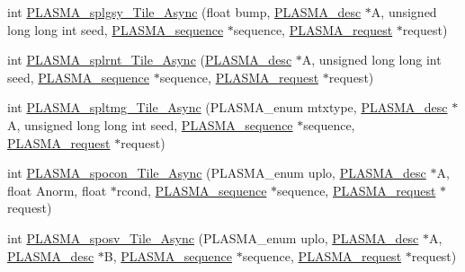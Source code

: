 \begin{DoxyCompactItemize}
\item 
int \hyperlink{group__float__Tile__Async_gaeee90dc0db10bd50a634bfd24658a5c6_gaeee90dc0db10bd50a634bfd24658a5c6}{P\+L\+A\+S\+M\+A\+\_\+splgsy\+\_\+\+Tile\+\_\+\+Async} (float bump, \hyperlink{structplasma__desc__t}{P\+L\+A\+S\+M\+A\+\_\+desc} $\ast$A, unsigned long long int seed, \hyperlink{structplasma__sequence__t}{P\+L\+A\+S\+M\+A\+\_\+sequence} $\ast$sequence, \hyperlink{structplasma__request__t}{P\+L\+A\+S\+M\+A\+\_\+request} $\ast$request)
\item 
int \hyperlink{group__float__Tile__Async_ga890ff04d43c21904fb6213d9b3b152fb_ga890ff04d43c21904fb6213d9b3b152fb}{P\+L\+A\+S\+M\+A\+\_\+splrnt\+\_\+\+Tile\+\_\+\+Async} (\hyperlink{structplasma__desc__t}{P\+L\+A\+S\+M\+A\+\_\+desc} $\ast$A, unsigned long long int seed, \hyperlink{structplasma__sequence__t}{P\+L\+A\+S\+M\+A\+\_\+sequence} $\ast$sequence, \hyperlink{structplasma__request__t}{P\+L\+A\+S\+M\+A\+\_\+request} $\ast$request)
\item 
int \hyperlink{group__float__Tile__Async_gabbc2518f1b3e7493ad860eb743ccb452_gabbc2518f1b3e7493ad860eb743ccb452}{P\+L\+A\+S\+M\+A\+\_\+spltmg\+\_\+\+Tile\+\_\+\+Async} (P\+L\+A\+S\+M\+A\+\_\+enum mtxtype, \hyperlink{structplasma__desc__t}{P\+L\+A\+S\+M\+A\+\_\+desc} $\ast$A, unsigned long long int seed, \hyperlink{structplasma__sequence__t}{P\+L\+A\+S\+M\+A\+\_\+sequence} $\ast$sequence, \hyperlink{structplasma__request__t}{P\+L\+A\+S\+M\+A\+\_\+request} $\ast$request)
\item 
int \hyperlink{group__float__Tile__Async_ga1d037b0a07761992e43c235ad307d042_ga1d037b0a07761992e43c235ad307d042}{P\+L\+A\+S\+M\+A\+\_\+spocon\+\_\+\+Tile\+\_\+\+Async} (P\+L\+A\+S\+M\+A\+\_\+enum uplo, \hyperlink{structplasma__desc__t}{P\+L\+A\+S\+M\+A\+\_\+desc} $\ast$A, float Anorm, float $\ast$rcond, \hyperlink{structplasma__sequence__t}{P\+L\+A\+S\+M\+A\+\_\+sequence} $\ast$sequence, \hyperlink{structplasma__request__t}{P\+L\+A\+S\+M\+A\+\_\+request} $\ast$request)
\item 
int \hyperlink{group__float__Tile__Async_ga566d68b010e8cfe877b1426ce1f26feb_ga566d68b010e8cfe877b1426ce1f26feb}{P\+L\+A\+S\+M\+A\+\_\+sposv\+\_\+\+Tile\+\_\+\+Async} (P\+L\+A\+S\+M\+A\+\_\+enum uplo, \hyperlink{structplasma__desc__t}{P\+L\+A\+S\+M\+A\+\_\+desc} $\ast$A, \hyperlink{structplasma__desc__t}{P\+L\+A\+S\+M\+A\+\_\+desc} $\ast$B, \hyperlink{structplasma__sequence__t}{P\+L\+A\+S\+M\+A\+\_\+sequence} $\ast$sequence, \hyperlink{structplasma__request__t}{P\+L\+A\+S\+M\+A\+\_\+request} $\ast$request)
\item 

\end{DoxyCompactItemize}
